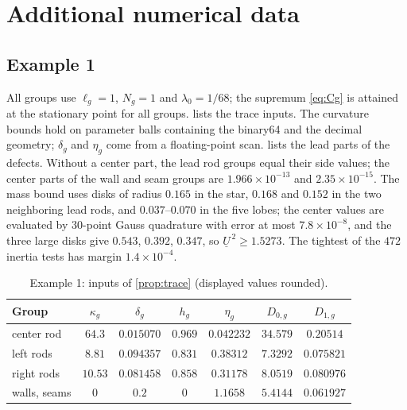 \section{Additional numerical data}\label{sm:results}

\subsection{Example 1}
All groups use $\ell_g=1$, $N_g=1$ and $\lambda_0=1/68$; the supremum
\eqref{eq:Cg} is attained at the stationary point for all groups.
 lists the trace inputs. The curvature bounds hold on parameter
balls containing the binary64 and the decimal geometry; $\delta_g$ and $\eta_g$
come from a floating-point scan.  lists the lead parts of the
defects. Without a center part, the lead rod groups equal their side values; the
center parts of the wall and seam groups are $1.966\times10^{-13}$ and
$2.35\times10^{-15}$. The mass bound uses disks of radius $0.165$ in the star, $0.168$
and $0.152$ in the two neighboring lead rods, and $0.037$--$0.070$ in the five lobes;
the center values are evaluated by $30$-point Gauss quadrature with error at most
$7.8\times10^{-8}$, and the three large disks give $0.543$, $0.392$, $0.347$, so
$\underline U^{\,2}\ge1.5273$. The tightest of the $472$ inertia tests has margin
$1.4\times10^{-4}$.

\begin{table}[tbhp]
\caption{Example 1: inputs of \cref{prop:trace} (displayed values rounded).}
\label{sm:tab-trace}
\centering\small
\begin{tabular}{lcccccc}
\toprule
Group & $\kappa_g$ & $\delta_g$ & $h_g$ & $\eta_g$ & $D_{0,g}$ & $D_{1,g}$\\
\midrule
center rod & $64.3$ & $0.015070$ & $0.969$ & $0.042232$ & $34.579$ & $0.20514$\\
left rods & $8.81$ & $0.094357$ & $0.831$ & $0.38312$ & $7.3292$ & $0.075821$\\
right rods & $10.53$ & $0.081458$ & $0.858$ & $0.31178$ & $8.0519$ & $0.080976$\\
walls, seams & $0$ & $0.2$ & $0$ & $1.1658$ & $5.4144$ & $0.061927$\\
\bottomrule
\end{tabular}
\end{table}

